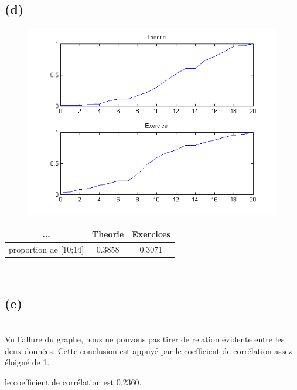 \documentclass[10pt,a4paper]{article}
\begin{document}
\subsection*{(d)}

\begin{figure}[h]
\centering
\includegraphics[scale= 0.5]{1d_graphe.png}
\end{figure}

\begin{center}
\begin{tabular}{|c|c|c|}
\hline
... & Theorie & Exercices \\
\hline
\hline
proportion de [10;14] & 0.3858 & 0.3071 \\
\hline
\end{tabular}
\end{center}
\ \\
 

\subsection*{(e)}
\ \\

Vu l'allure du graphe, nous ne pouvons pas tirer de relation évidente entre les deux données. Cette conclusion est appuyé par le coefficient de corrélation assez éloigné de 1.

le coefficient de corrélation est 0.2360.
\end{document}
